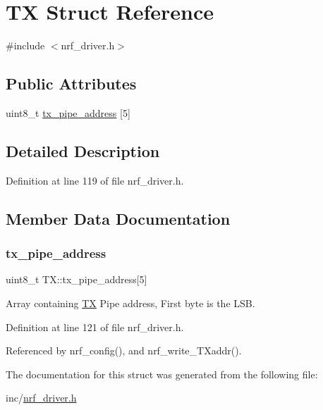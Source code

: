 \hypertarget{struct_t_x}{}\section{TX Struct Reference}
\label{struct_t_x}


{\ttfamily \#include $<$nrf\+\_\+driver.\+h$>$}

\subsection*{Public Attributes}
\begin{DoxyCompactItemize}
\item 
uint8\+\_\+t \hyperlink{struct_t_x_a53fe562ca0ad738c27ac2cbc19c77513}{tx\+\_\+pipe\+\_\+address} \mbox{[}5\mbox{]}
\end{DoxyCompactItemize}


\subsection{Detailed Description}


Definition at line 119 of file nrf\+\_\+driver.\+h.



\subsection{Member Data Documentation}
\mbox{\label{struct_t_x_a53fe562ca0ad738c27ac2cbc19c77513}} 
\subsubsection{\texorpdfstring{tx\+\_\+pipe\+\_\+address}{tx\_pipe\_address}}
{\footnotesize\ttfamily uint8\+\_\+t T\+X\+::tx\+\_\+pipe\+\_\+address\mbox{[}5\mbox{]}}

Array containing \hyperlink{struct_t_x}{TX} Pipe address, First byte is the L\+SB. 

Definition at line 121 of file nrf\+\_\+driver.\+h.



Referenced by nrf\+\_\+config(), and nrf\+\_\+write\+\_\+\+T\+Xaddr().



The documentation for this struct was generated from the following file\+:\begin{DoxyCompactItemize}
\item 
inc/\hyperlink{nrf__driver_8h}{nrf\+\_\+driver.\+h}\end{DoxyCompactItemize}
